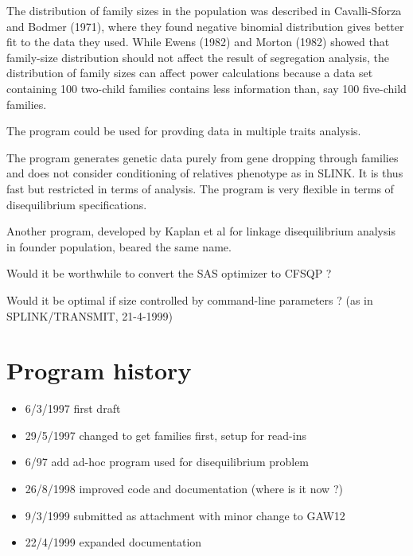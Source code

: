 \documentclass[12pt]{article}
\begin{document}
The distribution of family sizes in the population was
described in Cavalli-Sforza and Bodmer (1971), where they found negative binomial distribution
gives better fit to the data they used. While Ewens (1982) and
Morton (1982) 
showed that family-size distribution should not affect the result of segregation analysis, the
distribution of family sizes can affect power calculations because a data set containing
100 two-child families contains less information than, say 100 five-child families.

The program could be used for provding data in multiple traits analysis.

The program generates genetic data purely from gene dropping through families and does
not consider conditioning of relatives phenotype as in SLINK. It is thus fast but
restricted in terms of analysis.  The program is very flexible in terms of disequilibrium
specifications.

Another program, developed by Kaplan et al for linkage disequilibrium analysis in founder
population, beared the same name.

Would it be worthwhile to convert the SAS optimizer to CFSQP ?

Would it be optimal if size controlled by command-line parameters ? (as in
SPLINK/TRANSMIT, 21-4-1999)

\section{Program history}
\begin{itemize}
\item 6/3/1997 first draft
\item 29/5/1997 changed to get families first, setup for read-ins
\item 6/97 add ad-hoc program used for disequilibrium problem
\item 26/8/1998 improved code and documentation (where is it now ?)
\item 9/3/1999 submitted as attachment with minor change to GAW12
\item 22/4/1999 expanded documentation
\end{itemize}
\end{document}
